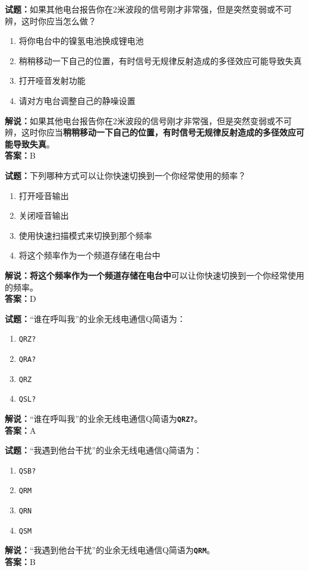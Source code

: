 \documentclass{ctexbook}
\begin{document}
\bigskip

\noindent\textbf{试题：}如果其他电台报告你在2米波段的信号刚才非常强，但是突然变弱或不可辨，这时你应当怎么做？
\begin{enumerate}[leftmargin=3em]
  \item 将你电台中的镍氢电池换成锂电池
  \item 稍稍移动一下自己的位置，有时信号无规律反射造成的多径效应可能导致失真
  \item 打开哑音发射功能
  \item 请对方电台调整自己的静噪设置
\end{enumerate}
\noindent\textbf{解说：}如果其他电台报告你在2米波段的信号刚才非常强，但是突然变弱或不可辨，这时你应当\textbf{稍稍移动一下自己的位置，有时信号无规律反射造成的多径效应可能导致失真}。\\\noindent\textbf{答案：}B

\bigskip

\noindent\textbf{试题：}下列哪种方式可以让你快速切换到一个你经常使用的频率？
\begin{enumerate}[leftmargin=3em]
  \item 打开哑音输出
  \item 关闭哑音输出
  \item 使用快速扫描模式来切换到那个频率
  \item 将这个频率作为一个频道存储在电台中
\end{enumerate}
\noindent\textbf{解说：}\textbf{将这个频率作为一个频道存储在电台中}可以让你快速切换到一个你经常使用的频率。\\\noindent\textbf{答案：}D

\bigskip

\noindent\textbf{试题：}“谁在呼叫我”的业余无线电通信Q简语为：

\begin{enumerate}[leftmargin=3em]
  \item \texttt{QRZ?}
  \item \texttt{QRA?}
  \item \texttt{QRZ}
  \item \texttt{QSL?}
\end{enumerate}

\noindent\textbf{解说：}“谁在呼叫我”的业余无线电通信Q简语为\texttt{\textbf{QRZ?}}。\\\noindent\textbf{答案：}A

\bigskip

\noindent\textbf{试题：}“我遇到他台干扰”的业余无线电通信Q简语为：

\begin{enumerate}[leftmargin=3em]
  \item \texttt{QSB?}
  \item \texttt{QRM}
  \item \texttt{QRN}
  \item \texttt{QSM}
\end{enumerate}
\noindent\textbf{解说：}“我遇到他台干扰”的业余无线电通信Q简语为\texttt{\textbf{QRM}}。\\\noindent\textbf{答案：}B
\end{document}
